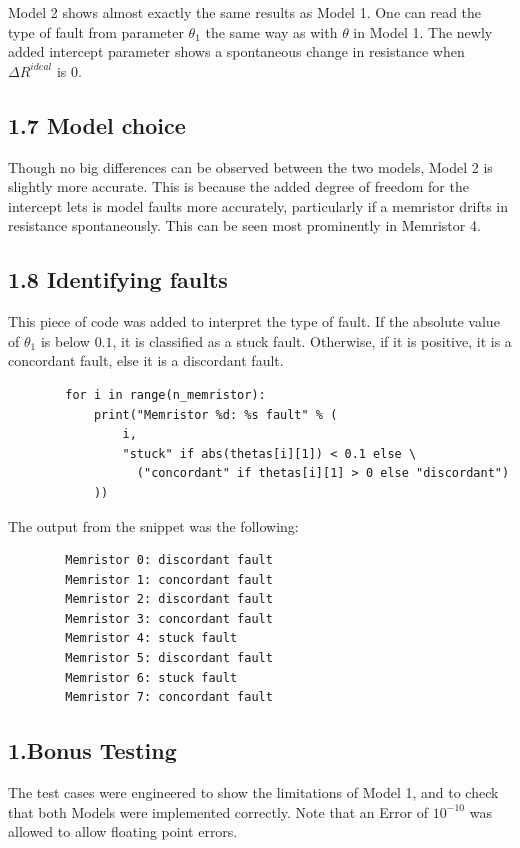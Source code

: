     Model 2 shows almost exactly the same results as Model 1.
    One can read the type of fault from parameter $\theta_1$ the same way as with $\theta$ in Model 1.
    The newly added intercept parameter shows a spontaneous change in resistance when $\Delta R^{ideal}$ is 0.

    \subsection*{1.7 Model choice}
    Though no big differences can be observed between the two models, Model 2 is slightly more accurate.
    This is because the added degree of freedom for the intercept lets is model faults more accurately,
    particularly if a memristor drifts in resistance spontaneously.
    This can be seen most prominently in Memristor 4.

    \subsection*{1.8 Identifying faults}
    This piece of code was added to interpret the type of fault.
    If the absolute value of $\theta_1$ is below $0.1$, it is classified as a stuck fault.
    Otherwise, if it is positive, it is a concordant fault, else it is a discordant fault.
    \begin{lstlisting}
        for i in range(n_memristor):
            print("Memristor %d: %s fault" % (
                i,
                "stuck" if abs(thetas[i][1]) < 0.1 else \
                  ("concordant" if thetas[i][1] > 0 else "discordant")
            ))
    \end{lstlisting}
    The output from the snippet was the following:
    \begin{lstlisting}
        Memristor 0: discordant fault
        Memristor 1: concordant fault
        Memristor 2: discordant fault
        Memristor 3: concordant fault
        Memristor 4: stuck fault
        Memristor 5: discordant fault
        Memristor 6: stuck fault
        Memristor 7: concordant fault
    \end{lstlisting}

    \subsection*{1.Bonus Testing}
    The test cases were engineered to show the limitations of Model 1,
    and to check that both Models were implemented correctly.
    Note that an Error of $10^{-10}$ was allowed to allow floating point errors.

